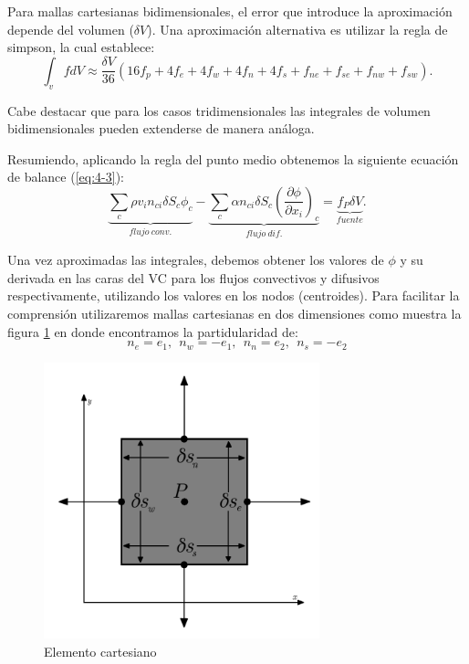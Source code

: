 \documentclass[a4paper,10pt, oneside]{book}
\begin{document}
Para mallas cartesianas bidimensionales, el error que introduce la aproximación depende del volumen ($\delta V$). Una aproximación alternativa es utilizar la regla de simpson, la cual establece:
\begin{equation}
	\int_v f dV \approx \frac{\delta V}{36}(16f_p + 4f_e + 4f_w + 4f_n + 4f_s + f_{ne}+ f_{se}+ f_{nw}+ f_{sw}). \nonumber
\end{equation}

Cabe destacar que para los casos tridimensionales las integrales de volumen bidimensionales pueden extenderse de manera análoga.

Resumiendo, aplicando la regla del punto medio obtenemos la siguiente ecuación de balance (\ref{eq:4-3}):
\begin{equation}
	\underbrace{\sum_c \rho v_i n_{ci} \delta S_c \phi_c}_{flujo ~ conv.} - \underbrace{\sum_c \alpha n_{ci} \delta S_c \left( \frac{\partial \phi}{\partial x_i} \right)_c}_{flujo ~ dif.} = \underbrace{f_P \delta V}_{fuente}.
	\label{eq:4-6}
\end{equation}

Una vez aproximadas las integrales, debemos obtener los valores de $\phi$ y su derivada en las caras del VC para los flujos convectivos y difusivos respectivamente, utilizando los valores en los nodos (centroides). Para facilitar la comprensión utilizaremos mallas cartesianas en dos dimensiones como muestra la figura \ref{img:4-8} en donde encontramos la partidularidad de:
\begin{equation}
	n_e = e_1, ~~ n_w = -e_1, ~~ n_n = e_2, ~~ n_s = -e_2
\end{equation}
\begin{figure}[h!]
	\centering
	\includegraphics[width=8cm]{Img/4-8}
	\caption{Elemento cartesiano}
	\label{img:4-8}
\end{figure}
\end{document}
